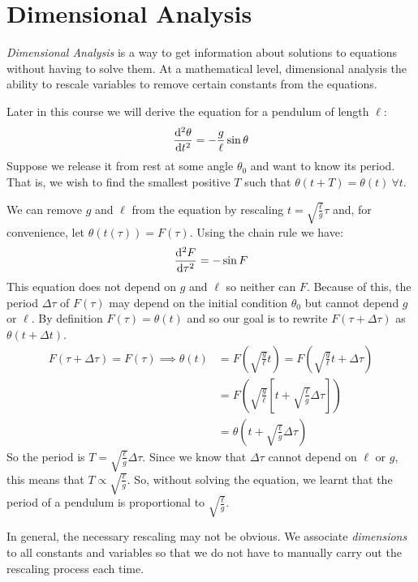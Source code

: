 \documentclass[../main.tex]{subfiles}
\begin{document}
\section{Dimensional Analysis}
\textit{Dimensional Analysis} is a way to get information about solutions to equations without having to solve them.
At a mathematical level, dimensional analysis the ability to rescale variables to remove certain constants from the equations.
\begin{example}
  \label{pendulumDimensions}
  Later in this course we will derive the equation for a pendulum of length $\ell$:
  \[
    \deriv[2]{\theta}{t} = - \frac{g}{\ell}\sin \theta
  \]
  Suppose we release it from rest at some angle $\theta_0$ and want to know its period.
  That is, we wish to find the smallest positive $T$ such that $\theta(t + T) = \theta(t)\ \forall t$.

  We can remove $g$ and $\ell$ from the equation by rescaling $t = \sqrt{\frac{\ell}{g}} \tau$ and, for convenience, let $\theta(t(\tau)) = F(\tau)$.
  Using the chain rule we have:
  \[
    \deriv[2]{F}{\tau} = -\sin F
  \]
  This equation does not depend on $g$ and $\ell$ so neither can $F$.
  Because of this, the period $\Delta \tau$ of $F(\tau)$ may depend on the initial condition $\theta_0$ but cannot depend $g$ or $\ell$.
  By definition $F(\tau) = \theta(t)$ and so our goal is to rewrite $F(\tau + \Delta \tau)$ as $\theta(t + \Delta t)$.
  \begin{align*}
    F(\tau + \Delta \tau) = F(\tau) \implies \theta(t) &= F\left(\sqrt{\frac{g}{\ell}}t\right) = F\left(\sqrt{\frac{g}{\ell}}t + \Delta \tau\right) \\
                                                       &= F\left(\sqrt{\frac{g}{\ell}}\left[t + \sqrt{\frac{\ell}{g}}\Delta \tau\right]\right) \\
                                                       &= \theta\left(t + \sqrt{\frac{\ell}{g}} \Delta \tau\right)
  \end{align*}
  So the period is $T = \sqrt{\frac{\ell}{g}} \Delta \tau$.
  Since we know that $\Delta \tau$ cannot depend on $\ell$ or $g$, this means that $T \propto \sqrt{\frac{\ell}{g}}$.
  So, without solving the equation, we learnt that the period of a pendulum is proportional to $\sqrt{\frac{\ell}{g}}$.
\end{example}
In general, the necessary rescaling may not be obvious.
We associate \textit{dimensions} to all constants and variables so that we do not have to manually carry out the rescaling process each time.
\end{document}
